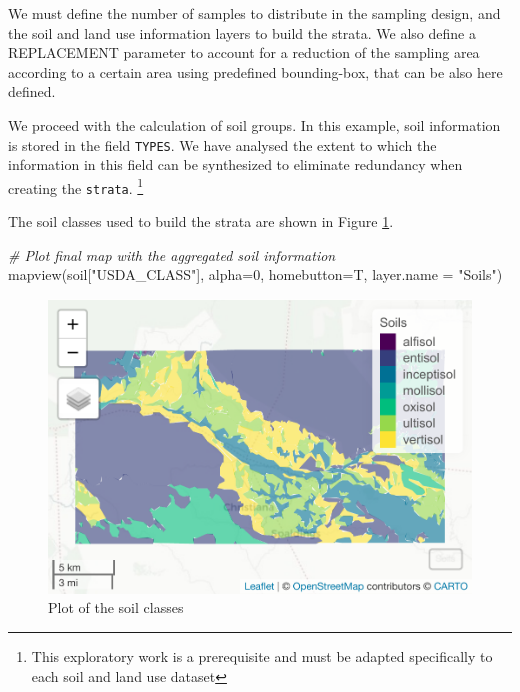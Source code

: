 \documentclass[
]{book}
\newenvironment{Shaded}{\begin{snugshade}}{\end{snugshade}}
\newcommand{\AttributeTok}[1]{\textcolor[rgb]{0.77,0.63,0.00}{#1}}
\newcommand{\CommentTok}[1]{\textcolor[rgb]{0.56,0.35,0.01}{\textit{#1}}}
\newcommand{\DecValTok}[1]{\textcolor[rgb]{0.00,0.00,0.81}{#1}}
\newcommand{\FunctionTok}[1]{\textcolor[rgb]{0.00,0.00,0.00}{#1}}
\newcommand{\NormalTok}[1]{#1}
\newcommand{\StringTok}[1]{\textcolor[rgb]{0.31,0.60,0.02}{#1}}
\begin{document}
We must define the number of samples to distribute in the sampling design, and the soil and land use information layers to build the strata. We also define a REPLACEMENT parameter to account for a reduction of the sampling area according to a certain area using predefined bounding-box, that can be also here defined.

We proceed with the calculation of soil groups. In this example, soil information is stored in the field \texttt{TYPES}. We have analysed the extent to which the information in this field can be synthesized to eliminate redundancy when creating the \texttt{strata}. \footnote{This exploratory work is a prerequisite and must be adapted specifically to each soil and land use dataset}

The soil classes used to build the strata are shown in Figure \ref{fig:fig-9a}.

\begin{Shaded}
\begin{Highlighting}[]
  \CommentTok{\# Plot final map with the aggregated soil information}
  \FunctionTok{mapview}\NormalTok{(soil[}\StringTok{"USDA\_CLASS"}\NormalTok{], }\AttributeTok{alpha=}\DecValTok{0}\NormalTok{, }\AttributeTok{homebutton=}\NormalTok{T, }\AttributeTok{layer.name =} \StringTok{"Soils"}\NormalTok{)}
\end{Highlighting}
\end{Shaded}

\begin{figure}
\centering
\includegraphics{Technical-Manual-Soil-Sampling-Design_files/figure-latex/fig-9a-1.pdf}
\caption{\label{fig:fig-9a}Plot of the soil classes}
\end{figure}
\end{document}
